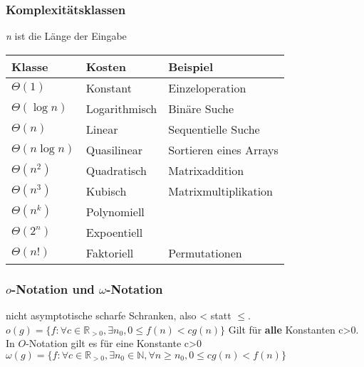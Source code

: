 \documentclass[jou,apacite]{apa6}
\begin{document}
\subsubsection{Komplexitätsklassen}
{\itshape n} ist die Länge der Eingabe
\begin{table}[h]
\centering
\begin{tabular}{|l|l|l|}
\hline
Klasse & Kosten & Beispiel \\
\hline
$\Theta(1)$     & Konstant    &  Einzeloperation         \\
 $\Theta(\log n)$    & Logarithmisch    &  Binäre Suche         \\
 $\Theta(n)$    & Linear   &  Sequentielle Suche         \\
 $\Theta(n \log n)$    & Quasilinear     &  Sortieren eines Arrays          \\
 $\Theta(n^2)$    & Quadratisch   & Matrixaddition      \\
 $\Theta(n^3)$    & Kubisch   &  Matrixmultiplikation        \\
 $\Theta(n^k)$    & Polynomiell    &           \\
 $\Theta(2^n)$    & Expoentiell    &           \\
$\Theta(n!)$     &  Faktoriell      &  Permutationen      \\
\hline
\end{tabular}
\end{table}

\subsubsection{$o$-Notation und $\omega$-Notation}
nicht asymptotische scharfe Schranken, also < statt $\leq$.
$o(g) = \{f : \forall c \in \mathbb{R}_{>0},\exists n_0,0 \le f(n) < cg(n)\}$
Gilt für {\bfseries alle} Konstanten c>0. In $O$-Notation gilt es für eine Konstante c>0
$\omega(g) = \{ f : \forall c \in \mathbb{R}_{>0},\exists n_0 \in \mathbb{N},\forall n \ge n_0,0\le cg(n) < f(n)\}$
\end{document}
